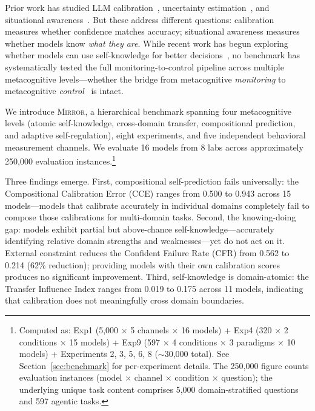\documentclass[10pt]{article}
\newcommand{\mirror}{\textsc{Mirror}}
\newcommand{\CCE}{CCE}
\newcommand{\CFR}{CFR}
\begin{document}
Prior work has studied LLM calibration~\citep{kadavath2022language,
kapoor2024calibration}, uncertainty estimation~\citep{lin2024generating}, and
situational awareness~\citep{laine2024me}. But these address different questions:
calibration measures whether confidence matches accuracy; situational awareness
measures whether models know \textit{what they are}. While recent work has begun exploring whether models can use self-knowledge for better decisions~\citep{schmied2026greedy, qiao2025agentic}, no benchmark has systematically tested the full monitoring-to-control pipeline across multiple metacognitive levels---whether the bridge from metacognitive \textit{monitoring} to
metacognitive \textit{control}~\citep{nelson1990metamemory} is intact.

We introduce \mirror{}, a hierarchical benchmark spanning four metacognitive levels
(atomic self-knowledge, cross-domain transfer, compositional prediction, and
adaptive self-regulation), eight experiments, and five independent behavioral
measurement channels. We evaluate 16 models from 8 labs across approximately
250,000 evaluation instances.\footnote{Computed as: Exp1 (5,000 $\times$ 5 channels $\times$ 16 models) + Exp4 (320 $\times$ 2 conditions $\times$ 15 models) + Exp9 (597 $\times$ 4 conditions $\times$ 3 paradigms $\times$ 10 models) + Experiments 2, 3, 5, 6, 8 ($\sim$30,000 total). See Section~\ref{sec:benchmark} for per-experiment details. The 250,000 figure counts evaluation instances (model $\times$ channel $\times$ condition $\times$ question); the underlying unique task content comprises 5,000 domain-stratified questions and 597 agentic tasks.}

Three findings emerge. First, compositional self-prediction fails universally: the Compositional Calibration Error (\CCE{}) ranges from 0.500 to 0.943 across
15 models---models that calibrate accurately in individual domains completely fail to
compose those calibrations for multi-domain tasks. Second, the knowing-doing gap:
models exhibit partial but above-chance self-knowledge---accurately identifying
relative domain strengths and weaknesses---yet do not act on it. External constraint
reduces the Confident Failure Rate (\CFR{}) from 0.562 to 0.214 (62\% reduction);
providing models with their own calibration scores produces no significant
improvement. Third, self-knowledge is domain-atomic: the Transfer Influence Index
ranges from 0.019 to 0.175 across 11 models, indicating that calibration does not
meaningfully cross domain boundaries.
\end{document}

